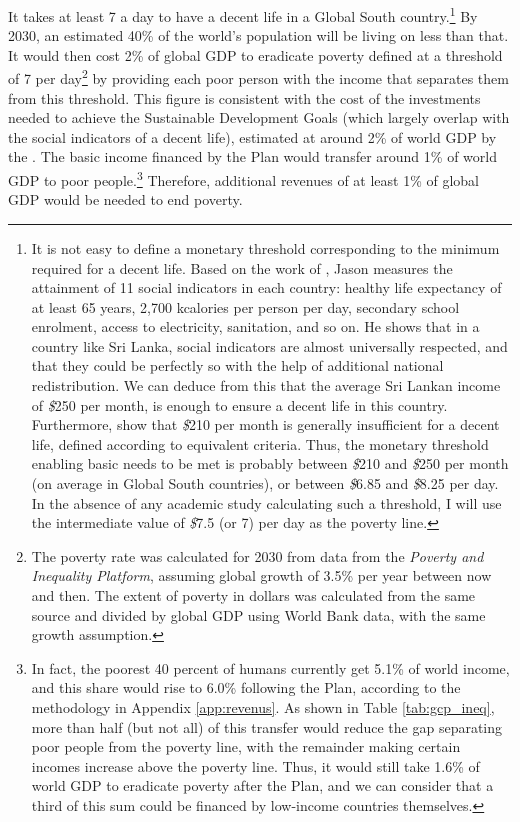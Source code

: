 \documentclass[a5paper,english,openany]{memoir}
\begin{document}
It takes at least \textit{\texteuro{}}7 a day to have a decent life in a Global South country.\footnote{It is not easy to define a monetary threshold corresponding to the minimum required for a decent life. Based on the work of \cite{oneill_good_2018}, Jason \cite{hickel_is_2019} measures the attainment of 11 social indicators in each country: healthy life expectancy of at least 65 years, 2,700 kcalories per person per day, secondary school enrolment, access to electricity, sanitation, and so on. He shows that in a country like Sri Lanka, social indicators are almost universally respected, and that they could be perfectly so with the help of additional national redistribution. We can deduce from this that the average Sri Lankan income of \textit{\$}250 
per month, %
is enough to ensure a decent life in this country. Furthermore, \cite{kikstra_decent_2021} show that \textit{\$}210 per month %
is generally insufficient for a decent life, defined according to equivalent criteria. Thus, the monetary threshold enabling basic needs to be met is probably between \textit{\$}210 and \textit{\$}250 per month (on average in Global South countries), or between \textit{\$}6.85 and \textit{\$}8.25 per day. In the absence of any academic study calculating such a threshold, I will use the intermediate value of \textit{\$}7.5 (or {\texteuro{}}7) per day as the poverty line.} 
By 2030, an estimated 40\% of the world's population will be living on less than that. %
It would then cost 2\% %
of global GDP to eradicate poverty defined at a threshold of \textit{\texteuro{}}7 per day\footnote{The poverty rate was calculated for 2030 from data from the \textit{Poverty and Inequality Platform}, assuming global growth of 3.5\% per year between now and then. The extent of poverty in dollars was calculated from the same source and divided by global GDP using World Bank data, with the same growth assumption.} 
by providing each poor person with the income that separates them from this threshold. This figure is consistent with the cost of the investments needed to achieve the Sustainable Development Goals (which largely overlap with the social indicators of a decent life), estimated at around 2\% of world GDP by the \citet{unctad_estimating_2021}. %
The basic income financed by the Plan would transfer around 1\% of world GDP to poor people.\footnote{In fact, the poorest 40 percent %
of humans currently get 5.1\% of world income, and this share would rise to 6.0\% following the Plan, according to the methodology in Appendix \ref{app:revenus}. As shown in Table \ref{tab:gcp_ineq}, more than half (but not all) of this transfer would reduce the gap separating poor people from the poverty line, with the remainder making certain incomes increase above the poverty line. Thus, it would still take 1.6\% of world GDP to eradicate poverty after the Plan, and we can consider that a third of this sum could be financed by low-income countries themselves.} Therefore, 
additional revenues of at least 1\% of global GDP would be needed to end poverty. %
\end{document}
